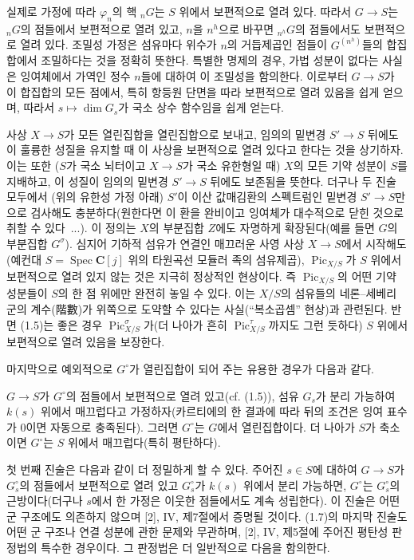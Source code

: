실제로 가정에 따라 $\varphi_n$의 핵 ${}_nG$는 $S$ 위에서 보편적으로
열려 있다. 따라서 $G\longrightarrow S$는 ${}_nG$의 점들에서 보편적으로
열려 있고, $n$을 $n^h$으로 바꾸면 ${}_{n^h}G$의 점들에서도 보편적으로
열려 있다. 조밀성 가정은 섬유마다 위수가 $n$의 거듭제곱인 점들이
$G^{(n^h)}$들의 합집합에서 조밀하다는 것을 정확히 뜻한다. 특별한 명제의
경우, 가법 성분이 없다는 사실은 잉여체에서 가역인 정수 $n$들에 대하여
이 조밀성을 함의한다. 이로부터 $G\longrightarrow S$가 이 합집합의 모든
점에서, 특히 항등원 단면을 따라 보편적으로 열려 있음을 쉽게 얻으며,
따라서 $s\longmapsto\dim G_s$가 국소 상수 함수임을 쉽게 얻는다.

 사상 $X\longrightarrow S$가 모든 열린집합을
열린집합으로 보내고, 임의의 밑변경 $S'\longrightarrow S$ 뒤에도 이 훌륭한
성질을 유지할 때 이 사상을 보편적으로 열려 있다고 한다는 것을 상기하자. 이는
또한 ($S$가 국소 뇌터이고 $X\longrightarrow S$가 국소 유한형일 때)
$X$의 모든 기약 성분이 $S$를 지배하고, 이 성질이 임의의 밑변경
$S'\longrightarrow S$ 뒤에도 보존됨을 뜻한다. 더구나 두 진술 모두에서
(위의 유한성 가정 아래) $S'$이 이산 값매김환의 스펙트럼인 밑변경
$S'\longrightarrow S$만으로 검사해도 충분하다(원한다면 이 환을 완비이고
잉여체가 대수적으로 닫힌 것으로 취할 수 있다~...). 이 정의는 $X$의 부분집합
$Z$에도 자명하게 확장된다(예를 들면 $G$의 부분집합 $G^\sigma$). 심지어
기하적 섬유가 연결인 매끄러운 사영 사상 $X\longrightarrow S$에서 시작해도
(예컨대 $S=\operatorname{Spec}\mathbf C[j]$ 위의 타원곡선 모듈러 족의
섬유제곱), $\operatorname{Pic}_{X/S}$가 $S$ 위에서 보편적으로 열려 있지
않는 것은 지극히 정상적인 현상이다. 즉
$\operatorname{Pic}_{X/S}$의 어떤 기약 성분들이 $S$의 한 점 위에만 완전히
놓일 수 있다. 이는 $X/S$의 섬유들의 네론--세베리 군의 계수(階數)가
위쪽으로 도약할 수 있다는 사실(``복소곱셈'' 현상)과 관련된다. 반면 (1.5)는
좋은 경우 $\operatorname{Pic}_{X/S}^\sigma$가(더 나아가 흔히
$\operatorname{Pic}_{X/S}^\tau$까지도 그런 듯하다) $S$ 위에서
보편적으로 열려 있음을 보장한다.

마지막으로 예외적으로 $G^\circ$가 열린집합이 되어 주는 유용한 경우가
다음과 같다.

 $G\longrightarrow S$가 $G^\circ$의 점들에서
보편적으로 열려 있고(cf. (1.5)), 섬유 $G_s$가 분리 가능하여 $k(s)$ 위에서
매끄럽다고 가정하자(카르티에의 한 결과에 따라 뒤의 조건은 잉여 표수가 0이면
자동으로 충족된다). 그러면 $G^\circ$는 $G$에서 열린집합이다. 더 나아가
$S$가 축소이면 $G^\circ$는 $S$ 위에서 매끄럽다(특히 평탄하다).

첫 번째 진술은 다음과 같이 더 정밀하게 할 수 있다. 주어진 $s\in S$에 대하여
$G\longrightarrow S$가 $G_s^\circ$의 점들에서 보편적으로 열려 있고
$G_s^\circ$가 $k(s)$ 위에서 분리 가능하면, $G^\circ$는
$G_s^\circ$의 근방이다(더구나 $s$에서 한 가정은 이웃한 점들에서도 계속
성립한다). 이 진술은 어떤 군 구조에도 의존하지 않으며 [2], IV, 제7절에서
증명될 것이다. (1.7)의 마지막 진술도 어떤 군 구조나 연결 성분에 관한
문제와 무관하며, [2], IV, 제5절에 주어진 평탄성 판정법의 특수한 경우이다.
그 판정법은 더 일반적으로 다음을 함의한다.

